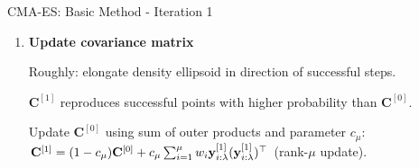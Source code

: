 \documentclass[11pt,compress,t,notes=noshow, xcolor=table]{beamer}
\begin{document}
\begin{vbframe}{CMA-ES: Basic Method - Iteration 1}
\begin{enumerate}
    \item \textbf{Update covariance matrix} %
    
        Roughly: elongate density ellipsoid in direction of successful steps.
        
        $\mathbf{C}^{[1]}$ reproduces successful points with higher probability than $\mathbf{C}^{[0]}$. %
        
        \vspace{-0.5cm}

        \begin{small}
            Update $\mathbf{C}^{[0]}$ using sum of outer products and parameter $c_{\mu}$: %
            $\mathbf{C}^{[1]} = (1-c_{\mu}) \mathbf{C}^{[0]} + c_{\mu} \sum_{i=1}^{\mu} w_i \mathbf{y}_{i:\lambda}^{[1]}(\mathbf{y}_{i:\lambda}^{[1]})^{\top}$ (rank-$\mu$ update).
        \end{small}

\end{enumerate}
\end{vbframe}
\end{document}
